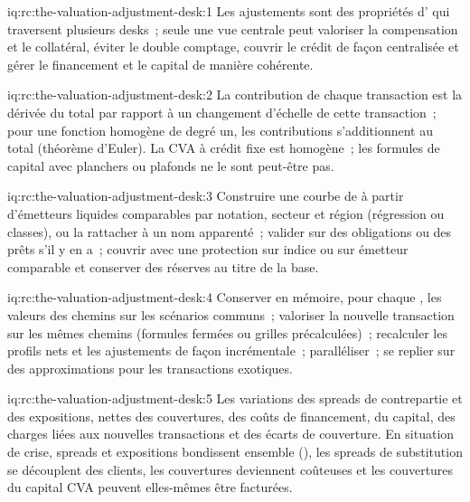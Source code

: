 \begin{solution}{iq:rc:the-valuation-adjustment-desk:1}
Les ajustements sont des propriétés d' qui traversent plusieurs desks~; seule une vue centrale peut valoriser
la compensation et le collatéral, éviter le double comptage, couvrir le crédit de façon centralisée et gérer le financement et
le capital de manière cohérente.
\end{solution}

\begin{solution}{iq:rc:the-valuation-adjustment-desk:2}
La contribution de chaque transaction est la dérivée du total par rapport à un changement d'échelle de cette transaction~;
pour une fonction homogène de degré un, les contributions s'additionnent au total (théorème d'Euler).
La CVA à crédit fixe est homogène~; les formules de capital avec planchers ou plafonds ne le sont peut-être pas.
\end{solution}

\begin{solution}{iq:rc:the-valuation-adjustment-desk:3}
Construire une courbe de  à partir d'émetteurs liquides comparables par notation, secteur et région (régression ou classes), ou
la rattacher à un nom apparenté~; valider sur des obligations ou des prêts s'il y en a~; couvrir avec une protection sur indice ou
sur émetteur comparable et conserver des réserves au titre de la base.
\end{solution}

\begin{solution}{iq:rc:the-valuation-adjustment-desk:4}
Conserver en mémoire, pour chaque , les valeurs des chemins sur les scénarios communs~; valoriser la nouvelle transaction sur
les mêmes chemins (formules fermées ou grilles précalculées)~; recalculer les profils nets et
les ajustements de façon incrémentale~; paralléliser~; se replier sur des approximations pour les transactions exotiques.
\end{solution}

\begin{solution}{iq:rc:the-valuation-adjustment-desk:5}
Les variations des spreads de contrepartie et des expositions, nettes des couvertures, des coûts de financement, du capital, des charges liées aux
nouvelles transactions et des écarts de couverture. En situation de crise, spreads et expositions bondissent ensemble (),
les spreads de substitution se découplent des clients, les couvertures deviennent coûteuses et les couvertures du capital CVA peuvent elles-mêmes
être facturées.
\end{solution}

